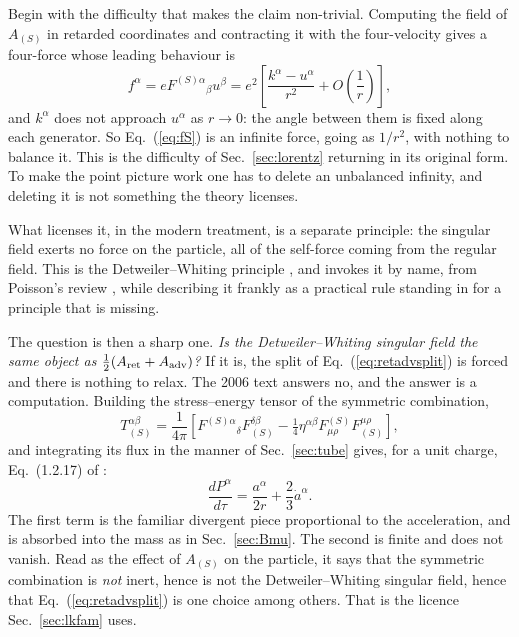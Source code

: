 \documentclass[preprint]{aastex701}
\begin{document}
Begin with the difficulty that makes the claim non-trivial. Computing the field
of $A_{(S)}$ in retarded coordinates and contracting it with the four-velocity
gives a four-force whose leading behaviour is
\begin{equation}
f^\alpha = e F^{(S)\alpha}{}_\beta u^\beta
= e^2\left[\frac{k^\alpha - u^\alpha}{r^2} + O\!\left(\frac1r\right)\right],
\label{eq:fS}
\end{equation}
and $k^\alpha$ does not approach $u^\alpha$ as $r\to0$: the angle between them
is fixed along each generator. So Eq.~(\ref{eq:fS}) is an infinite force, going
as $1/r^2$, with nothing to balance it. This is the difficulty of
Sec.~\ref{sec:lorentz} returning in its original form. To make the point
picture work one has to delete an unbalanced infinity, and deleting it is not
something the theory licenses.

What licenses it, in the modern treatment, is a separate principle: the
singular field exerts no force on the particle, all of the self-force coming
from the regular field. This is the Detweiler--Whiting principle
\citep{detweiler_whiting2003}, and \citet{zhang2006} invokes it by name, from
Poisson's review \citep{poisson2004}, while describing it frankly as a
practical rule standing in for a principle that is missing.

The question is then a sharp one. \emph{Is the Detweiler--Whiting singular
field the same object as $\tfrac12(A_{\rm ret}+A_{\rm adv})$?} If it is, the
split of Eq.~(\ref{eq:retadvsplit}) is forced and there is nothing to relax. The
2006 text answers no, and the answer is a computation. Building the
stress--energy tensor of the symmetric combination,
\begin{equation}
T^{\alpha\beta}_{(S)} = \frac{1}{4\pi}
\left[F^{(S)\alpha}{}_{\delta}F^{\delta\beta}_{(S)}
      - \tfrac14\eta^{\alpha\beta}F^{(S)}_{\mu\rho}F_{(S)}^{\mu\rho}\right],
\label{eq:TS}
\end{equation}
and integrating its flux in the manner of Sec.~\ref{sec:tube} gives, for a unit
charge, Eq.~(1.2.17) of \citet{zhang2006}:
\begin{equation}
\frac{dP^\alpha}{d\tau} = \frac{a^\alpha}{2r} + \frac{2}{3}\dot a^\alpha .
\label{eq:1217}
\end{equation}
The first term is the familiar divergent piece proportional to the
acceleration, and is absorbed into the mass as in
Sec.~\ref{sec:Bmu}. The second is finite and does not vanish. Read as the
effect of $A_{(S)}$ on the particle, it says that the symmetric combination is
\emph{not} inert, hence is not the Detweiler--Whiting singular field, hence
that Eq.~(\ref{eq:retadvsplit}) is one choice among others. That is the licence
Sec.~\ref{sec:lkfam} uses.
\end{document}
